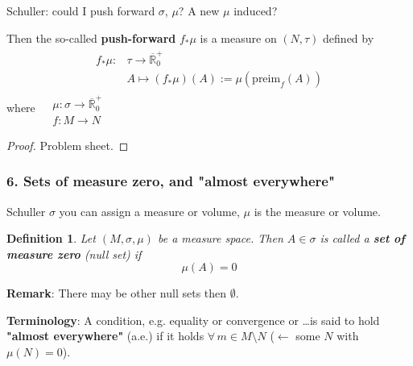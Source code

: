 \documentclass[10pt]{amsart}
\newtheorem{definition}{Definition}
\begin{document}
\begin{multicols*}{2}

Schuller: could I push forward $\sigma$, $\mu$? A new $\mu$ induced?

Then the so-called \textbf{push-forward} $f_*\mu$ is a measure on $(N, \tau)$ defined by 
\[
\begin{gathered}
\begin{aligned}
f_*\mu : & \tau \to \overline{\mathbb{R}}^+_0 \\
& A \mapsto (f_* \mu)(A) := \mu(\text{preim}_f(A))
\end{aligned}
\end{gathered}
\]
where $\begin{aligned}
	& \mu : \sigma \to \overline{\mathbb{R}}^+_0 \\
	& f: M \to N
\end{aligned}$

\begin{proof}
	Problem sheet.
\end{proof}

\subsubsection{6. Sets of measure zero, and "almost everywhere"}

Schuller $\sigma$ you can assign a measure or volume, $\mu$ is the measure or volume.

\begin{definition}
	Let $(M, \sigma, \mu)$ be a measure space. Then
	$A\in \sigma$ is called a \textbf{set of measure zero} (null set) if
	\[
	\mu(A) = 0
	\]
\end{definition}

\textbf{Remark}: There may be other null sets then $\emptyset$.

\textbf{Terminology}: A condition, e.g. equality or convergence or \dots is said to hold \textbf{"almost everywhere"} (a.e.) if it holds $\forall \, m \in M \setminus N$ ($\leftarrow$ some $N$ with $\mu(N) = 0$).


\end{multicols*}
\end{document}
